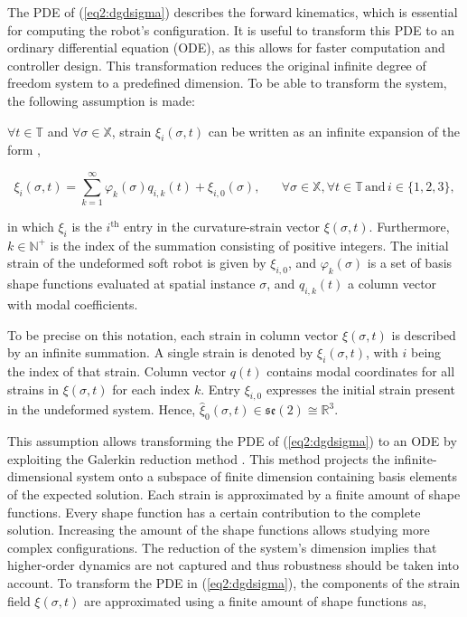 The PDE of (\ref{eq2:dgdsigma}) describes the forward kinematics, which is essential for computing the robot's configuration. It is useful to transform this PDE to an ordinary differential equation (ODE), as this allows for faster computation and controller design. This transformation reduces the original infinite degree of freedom system to a predefined dimension. To be able to transform the system, the following assumption is made: 

\begin{theorem}

$\forall t \in \mathbb{T}$ and $\forall \sigma \in \mathbb{X}$, strain $\xi_i(\sigma,t)$ can be written as an infinite expansion of the form \cite{Caasenbrood2021},

\begin{equation}
\xi_i(\sigma,t) = \sum_{k=1}^\infty \varphi_k(\sigma)q_{i,k}(t) + \xi_{i,0}(\sigma), \hspace{20pt} \forall \sigma \in \mathbb{X}, \forall t \in \mathbb{T} \hspace{2pt} \text{and} \hspace{2pt} i \in \{1,2,3\},
\label{eq2:strainexact}
\end{equation}

in which $\xi_{i}$ is the $i^{\text{th}}$ entry in the curvature-strain vector $\xi(\sigma,t)$. Furthermore, $k \in \mathbb{N}^+$ is the index of the summation consisting of positive integers. The initial strain of the undeformed soft robot is given by $\xi_{i,0}$, and $\varphi_k(\sigma)$ is a set of basis shape functions evaluated at spatial instance $\sigma$, and $q_{i,k}(t)$ a column vector with modal coefficients. 
\end{theorem}

To be precise on this notation, each strain in column vector $\xi(\sigma,t)$ is described by an infinite summation. A single strain is denoted by $\xi_i(\sigma,t)$, with $i$ being the index of that strain. Column vector $q(t)$ contains modal coordinates for all strains in $\xi(\sigma,t)$ for each index $k$. Entry $\xi_{i,0}$ expresses the initial strain present in the undeformed system. Hence, $\hat{\xi}_0(\sigma,t) \in \mathfrak{se}(2) \cong \mathbb{R}^3$. 

This assumption allows transforming the PDE of (\ref{eq2:dgdsigma}) to an ODE by exploiting the Galerkin reduction method \cite{Galerkin}. This method projects the infinite-dimensional system onto a subspace of finite dimension containing basis elements of the expected solution. Each strain is approximated by a finite amount of shape functions. Every shape function has a certain contribution to the complete solution. Increasing the amount of the shape functions allows studying more complex configurations. The reduction of the system's dimension implies that higher-order dynamics are not captured and thus robustness should be taken into account. To transform the PDE in (\ref{eq2:dgdsigma}), the components of the strain field $\xi(\sigma,t)$ are approximated using a finite amount of shape functions as,

